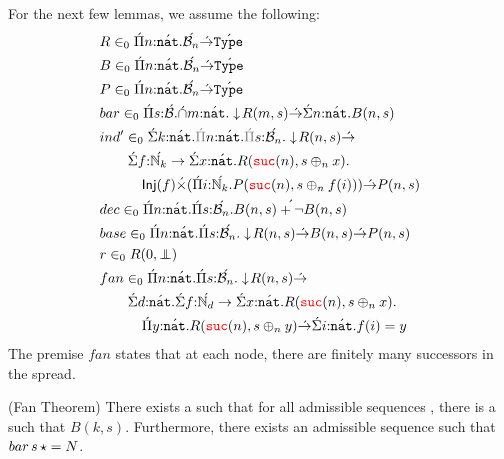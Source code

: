 For the next few lemmas, we assume the following:
  \begin{align*}
    &\isVal{R}{\pityc{\isOf{n}{\lift{\nat}}}{\lift{\nseq{n}} \tolr \lift{\type{}}}}\\
    &\isVal{B}{\pityc{\isOf{n}{\lift{\nat}}}{\lift{\nseq{n}} \tolr \lift{\type{}}}}\\
    &\isVal{P}{\pityc{\isOf{n}{\lift{\nat}}}{\lift{\nseq{n}} \tolr \lift{\type{}}}}\\
    &\isVal{bar}{\pityc{\isOf{s}{\lift{\baire}}}{\inttyc{\isOf{m}{\lift{\nat}}}{\squash{R(m,s)}} 
      \tolr \sigmatyc{\isOf{n}{\lift{\nat}}}{B(n,s)}}}\\
    &\isVal{ind'}{\sigmatyc{\isOf{k}{\lift{\nat}}}{
        \pityzc{\isOf{n}{\lift{\nat}}}{\pityzc{\isOf{s}{\lift{\nseq{n}}}}
        {\squash{R(n,s)} \tolr \\
        &\quad\quad\sigmatyc{\isOf{f}{\lift{\N_k} \to 
        \sigmatyc{\isOf{x}{\lift{\nat}}}{R(\suc{n},s \oplus_n x)}}}{\\
      &\quad\quad\quad\Inj{f} \lift{\times} 
        (\pityc{\isOf{i}{\lift{\N_k}}}{P(\suc{n}, s \oplus_n f(i))}}) \tolr P(n,s)}}}}\\
    &\isVal{dec}{\pityc{\isOf{n}{\lift{\nat}}}{\pityc{\isOf{s}{\lift{\nseq{n}}}}{\lift{B(n,s) + \neg B(n,s)}}}}\\
    &\isVal{base}{\pityc{\isOf{n}{\lift{\nat}}}{\pityc{\isOf{s}{\lift{\nseq{n}}}}{\squash{R(n,s)} \tolr 
      B(n,s) \tolr P(n,s)}}}\\
    &\isVal{r}{R(0,\empseq)}\\
  &\isVal{fan}{
      \pityc{\isOf{n}{\lift{\nat}}}{\pityc{\isOf{s}{\lift{\nseq{n}}}}{
        \squash{R(n,s)} \tolr \\
        &\quad\quad\sigmatyc{\isOf{d}{\lift{\nat}}}{
        \sigmatyc{\isOf{f}{\lift{\N_d} \to 
        \sigmatyc{\isOf{x}{\lift{\nat}}}{R(\suc{n},s \oplus_n x)}}}{\\
      &\quad\quad\quad\pityc{\isOf{y}{\lift{\nat}}}{
        R(\suc{n}, s\oplus_n y) \tolr \sigmatyc{\isOf{i}{\lift{\nat}}}{f(i) = y}
      }
    }
  }}}}
  \end{align*}
  The premise $fan$ states that at each node, there are finitely many successors in the spread.
\begin{lemma}(Fan Theorem)
  There exists a  such that for all admissible sequences ,
  there is a  such that
  $B(k,s)$. Furthermore, there exists an admissible sequence  such that
  $bar\,s\,\star = N$.
\end{lemma}

